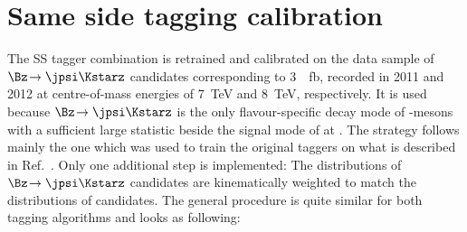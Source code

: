 \section{Same side tagging calibration}
\label{sec:SScalibration}

The SS tagger combination is retrained and calibrated on the data sample of $\Bz\!\to\jpsi\Kstarz$ candidates corresponding to \SI{3}{\per\femto\barn}, recorded in \num{2011} and \num{2012} at centre-of-mass energies of \SI{7}{\tera\electronvolt} and \SI{8}{\tera\electronvolt}, respectively.
It is used because $\Bz\!\to\jpsi\Kstarz$ is the only flavour-specific decay mode of \Bz-mesons with a sufficient large statistic beside the signal mode of \BdToDpi at \lhcb.
The strategy follows mainly the one which was used to train the original taggers on \BdToDpi what is described in Ref.~\cite{Aaij:2016rdg}.
Only one additional step is implemented:
The distributions of $\Bz\!\to\jpsi\Kstarz$ candidates are kinematically weighted to match the distributions of \BdToDpi candidates.
The general procedure is quite similar for both tagging algorithms and looks as following:
